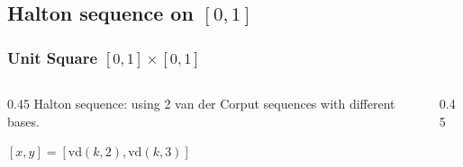 \documentclass[serif]{beamer} %
\begin{document}
\subsection{Halton sequence on $[0,1]$}
\begin{frame}[fragile]
\frametitle{Unit Square $[0,1] \times [0,1]$}
\begin{columns}
\begin{column}{0.45\textwidth}
Halton sequence: using 2 van der Corput sequences with different bases.
\begin{example}
    $[x,y] = [\mathrm{vd}(k,2), \mathrm{vd}(k,3)]$
\end{example}
\end{column}
\begin{column}{0.45\textwidth}
\end{column}
\end{columns}
\end{frame}
\end{document}
